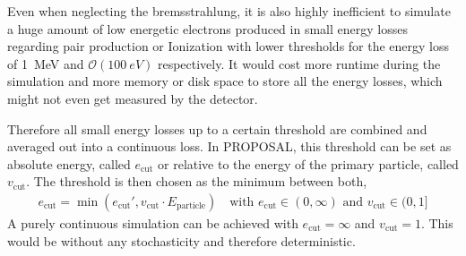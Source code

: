 Even when neglecting the bremsstrahlung, it is also highly inefficient to simulate a huge amount of low energetic electrons produced in small energy losses regarding pair production or Ionization with lower thresholds for the energy loss of \SI{1}{MeV} and $\mathcal{O}(\SI{100}{eV})$ respectively.
It would cost more runtime during the simulation and more memory or disk space to store all the energy losses, which might not even get measured by the detector.

Therefore all small energy losses up to a certain threshold are combined and averaged out into a continuous loss.
In PROPOSAL, this threshold can be set as absolute energy, called $e_{\textrm{cut}}$ or relative to the energy of the primary particle, called $v_{\textrm{cut}}$.
The threshold is then chosen as the minimum between both,
\begin{align} \label{eq:ecut}
    e_{\textrm{cut}} = \min(e_{\textrm{cut}}', v_{\textrm{cut}} \cdot E_{\mathrm{particle}})
    \quad
    \text{with }
    e_{\textrm{cut}} \in (0, \infty)
    \text{ and }
    v_{\textrm{cut}} \in (0, 1]
\end{align}
A purely continuous simulation can be achieved with $e_{\textrm{cut}}=\infty$ and $v_{\textrm{cut}}=1$.
This would be without any stochasticity and therefore deterministic.

